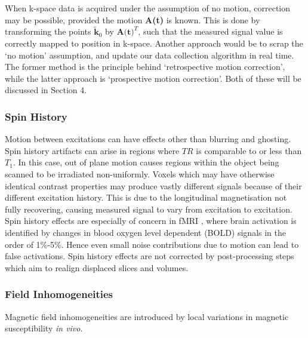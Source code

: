 \documentclass[class=article, crop=false]{standalone}
\begin{document}
\par
When k-space data is acquired under the assumption of no motion, correction may be possible, provided the motion \textbf{A(t)} is known. This is done by transforming the points $\tilde{\textbf{k}}_0$ by $\textbf{A(t)}^T$, such that the measured signal value is correctly mapped to position in k-space. Another approach would be to scrap the `no motion' assumption, and update our data collection algorithm in real time. The former method is the principle behind `retrospective motion correction', while the latter approach is `prospective motion correction'. Both of these will be discussed in Section 4.

\subsubsection*{Spin History}
Motion between excitations can have effects other than blurring and ghosting. Spin history artifacts can arise in regions where $TR$ is comparable to or less than $T_1$. In this case, out of plane motion causes regions within the object being scanned to be irradiated non-uniformly. Voxels which may have otherwise identical contrast properties may produce vastly different signals because of their different excitation history. This is due to the longitudinal magnetisation not fully recovering, causing measured signal to vary from excitation to excitation. Spin history effects are especially of concern in fMRI \parencite{Friston1996,Muresan2005}, where brain activation is identified by changes in blood oxygen level dependent (BOLD) signals in the order of 1\%-5\%. Hence even small noise contributions due to motion can lead to false activations. Spin history effects are not corrected by post-processing steps which aim to realign displaced slices and volumes.

\subsubsection*{Field Inhomogeneities}
Magnetic field inhomogeneities are introduced by local variations in magnetic susceptibility \textit{in vivo}.
\end{document}

